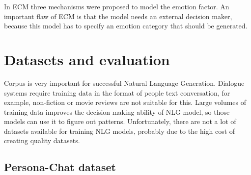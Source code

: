 In ECM three mechanisms were proposed to model the emotion factor. An important flaw of ECM is that the model needs an external decision maker, because this model has to specify an emotion category that should be generated.

\chapter{Datasets and evaluation} \label{eval_datasets_section}
Corpus is very important for successful Natural Language Generation. Dialogue systems require training data in the format of people text conversation, for example, non-fiction or movie reviews are not suitable for this. Large volumes of training data improves the decision-making ability of NLG model, so those models can use it to figure out patterns. Unfortunately, there are not a lot of datasets available for training NLG models, probably due to the high cost of creating quality datasets.  

\section{Persona-Chat dataset} \label{persona_chat_subsec}

